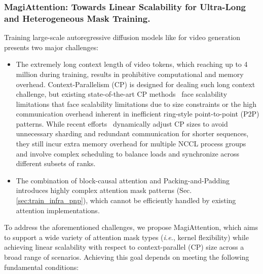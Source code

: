 
\subsubsection{MagiAttention: Towards Linear Scalability for Ultra-Long and Heterogeneous Mask Training.}\label{sec:magiattn}



Training large-scale autoregressive diffusion models like \magi for video generation presents two major challenges: 

\begin{itemize}
    \item The extremely long context length of video tokens, which reaching up to 4 million during training, results in prohibitive computational and memory overhead. Context-Parallelism (CP) is designed for dealing such long context challenge, but existing state-of-the-art CP methods~\citep{jacobs2023deepspeed, liu2023ringattentionblockwisetransformers, fang2024uspunifiedsequenceparallelism, gu2024loongtrainefficienttraininglongsequence, chen2024longvilascalinglongcontextvisual} face scalability limitations that face scalability limitations due to size constraints or the high communication overhead inherent in inefficient ring-style point-to-point (P2P) patterns. While recent efforts~\citep{wang2024datacentricheterogeneityadaptivesequenceparallelism, zhang2024dcp, ge2025bytescaleefficientscalingllm} dynamically adjust CP sizes to avoid unnecessary sharding and redundant communication for shorter sequences, they still incur extra memory overhead for multiple NCCL process groups and involve complex scheduling to balance loads and synchronize across different subsets of ranks.
    \item The combination of block-causal attention and Packing-and-Padding introduces highly complex attention mask patterns (Sec.\ref{sec:train_infra_pnp}), which cannot be efficiently handled by existing attention implementations.
\end{itemize}





To address the aforementioned challenges, we propose MagiAttention, which aims to support a wide variety of attention mask types (\emph{i.e.}, kernel flexibility) while achieving linear scalability with respect to context-parallel (CP) size across a broad range of scenarios. Achieving this goal depends on meeting the following fundamental conditions:

